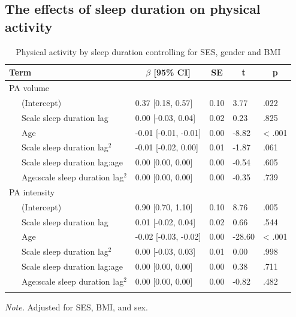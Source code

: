 \documentclass[
  man]{apa6}
\begin{document}
\hypertarget{the-effects-of-sleep-duration-on-physical-activity}{%
\subsection{The effects of sleep duration on physical activity}\label{the-effects-of-sleep-duration-on-physical-activity}}

\begin{table}[tbp]

\begin{center}
\begin{threeparttable}

\caption{\label{tab:PA-by-sleep-duration}Physical activity  by sleep duration controlling for SES, gender and BMI}

\begin{tabular}{lllll}
\toprule
Term & \multicolumn{1}{c}{$\beta$ [95\% CI]} & \multicolumn{1}{c}{SE} & \multicolumn{1}{c}{t} & \multicolumn{1}{c}{p}\\
\midrule
PA volume &  &  &  & \\
\ \ \ (Intercept) & 0.37 [0.18, 0.57] & 0.10 & 3.77 & .022\\
\ \ \ Scale sleep duration lag & 0.00 [-0.03, 0.04] & 0.02 & 0.23 & .825\\
\ \ \ Age & -0.01 [-0.01, -0.01] & 0.00 & -8.82 & < .001\\
\ \ \ Scale sleep duration lag$^2$ & -0.01 [-0.02, 0.00] & 0.01 & -1.87 & .061\\
\ \ \ Scale sleep duration lag:age & 0.00 [0.00, 0.00] & 0.00 & -0.54 & .605\\
\ \ \ Age:scale sleep duration lag$^2$ & 0.00 [0.00, 0.00] & 0.00 & -0.35 & .739\\
PA intensity &  &  &  & \\
\ \ \ (Intercept) & 0.90 [0.70, 1.10] & 0.10 & 8.76 & .005\\
\ \ \ Scale sleep duration lag & 0.01 [-0.02, 0.04] & 0.02 & 0.66 & .544\\
\ \ \ Age & -0.02 [-0.03, -0.02] & 0.00 & -28.60 & < .001\\
\ \ \ Scale sleep duration lag$^2$ & 0.00 [-0.03, 0.03] & 0.01 & 0.00 & .998\\
\ \ \ Scale sleep duration lag:age & 0.00 [0.00, 0.00] & 0.00 & 0.38 & .711\\
\ \ \ Age:scale sleep duration lag$^2$ & 0.00 [0.00, 0.00] & 0.00 & -0.82 & .482\\
\bottomrule
\addlinespace
\end{tabular}

\begin{tablenotes}[para]
\normalsize{\textit{Note.} Adjusted for SES, BMI, and sex. }
\end{tablenotes}

\end{threeparttable}
\end{center}

\end{table}
\end{document}
